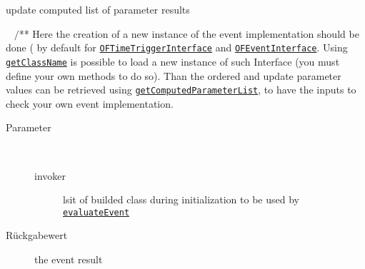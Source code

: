 \begin{description}
\begin{description}
update computed list of parameter results
\end{description}
\item[{\ltdHypertarget{ontologyFramework.OFEventManagement.OFEventRepresentation.compute(ontologyFramework.OFRunning.OFInvokingManager.OFBuildedListInvoker)}{compute}\label{ontologyFramework.OFEventManagement.OFEventRepresentation.compute(ontologyFramework.OFRunning.OFInvokingManager.OFBuildedListInvoker)}}]
~ $/$**
 Here the creation of a new instance of the event implementation should be done
 ( by default for \texttt{\hyperlink{ontologyFramework.OFEventManagement.OFTimeTriggerManagement.OFTimeTriggerInterface-class}{OFTimeTriggerInterface}} and \texttt{\hyperlink{ontologyFramework.OFEventManagement.OFLogicalEventManagement.OFEventInterface-class}{OFEventInterface}}. 
 Using \texttt{\hyperlink{ontologyFramework.OFEventManagement.OFEventRepresentation.getClassName()}{getClassName}} is possible to load a new instance of such
 Interface (you must define your own methods to do so). Than the ordered and 
 update parameter values can be retrieved using \texttt{\hyperlink{ontologyFramework.OFEventManagement.OFEventRepresentation.getComputedParameterList()}{getComputedParameterList}},
 to have the inputs to check your own event implementation.
\begin{description}
\item[Parameter] ~
\begin{description}
\item[invoker]
lsit of builded class during initialization to be used by \texttt{\hyperlink{ontologyFramework.OFEventManagement.OFLogicalEventManagement.OFEventInterface.evaluateEvent(java.util.List<ontologyFramework.OFEventManagement.EventComputedData>,ontologyFramework.OFRunning.OFInvokingManager.OFBuildedListInvoker)}{evaluateEvent}}
\end{description}
\item[Rückgabewert] 
the event result
\end{description}
\end{description}
